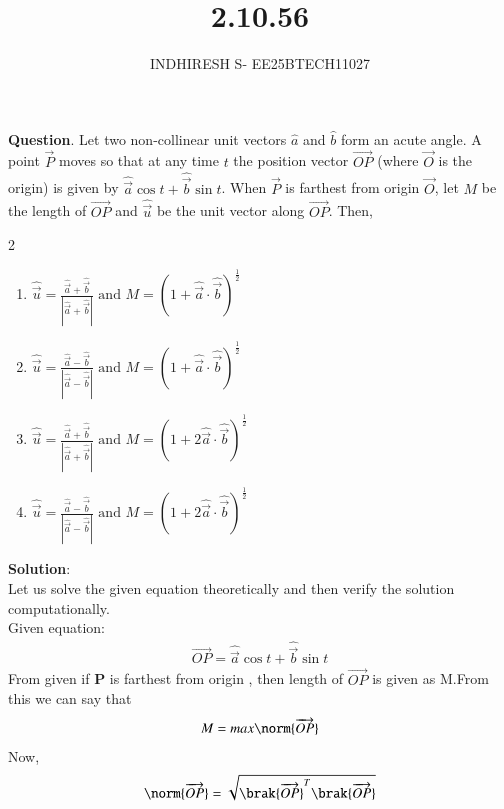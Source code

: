 \documentclass[journal]{IEEEtran}
\theoremstyle{remark}
\begin{document}

\onecolumn

\title{2.10.56}
\author{INDHIRESH S- EE25BTECH11027}
\maketitle


\renewcommand{\thefigure}{\theenumi}
\renewcommand{\thetable}{\theenumi}

\textbf{Question}.  Let two non-collinear unit vectors $\hat{a}$ and $\hat{b}$ form an acute angle. A point $\vec{P}$ moves so that at any time $t$ the position vector $\overrightarrow{OP}$ (where $\vec{O}$ is the origin) is given by $\hat{\vec{a}}\cos{t} + \hat{\vec{b}}\sin{t}$. When $\vec{P}$ is farthest from origin $\vec{O}$, let $M$ be the length of $\overrightarrow{OP}$ and $\hat{\vec{u}}$ be the unit vector along $\overrightarrow{OP}$. Then,
\begin{multicols}{2} 
    \begin{enumerate}
	    \item $\hat{\vec{u}} = \frac{\hat{\vec{a}}+\hat{\vec{b}}}{|\hat{\vec{a}}+\hat{\vec{b}}|} \text{ and } M = (1+\hat{\vec{a}} \cdot \hat{\vec{b}})^{\frac{1}{2}}$
    	\item $\hat{\vec{u}} = \frac{\hat{\vec{a}}-\hat{\vec{b}}}{|\hat{\vec{a}}-\hat{\vec{b}}|} \text{ and } M = (1+\hat{\vec{a}} \cdot \hat{\vec{b}})^{\frac{1}{2}}$
    	\item $\hat{\vec{u}} = \frac{\hat{\vec{a}}+\hat{\vec{b}}}{|\hat{\vec{a}}+\hat{\vec{b}}|} \text{ and } M = (1+2\hat{\vec{a}} \cdot \hat{\vec{b}})^{\frac{1}{2}}$
    	\item $\hat{\vec{u}} = \frac{\hat{\vec{a}}-\hat{\vec{b}}}{|\hat{\vec{a}}-\hat{\vec{b}}|} \text{ and } M = (1+2\hat{\vec{a}} \cdot \hat{\vec{b}})^{\frac{1}{2}}$
    \end{enumerate}
    \end{multicols}
\textbf{Solution}:\\
Let us solve the given equation theoretically and then verify the solution computationally. \\
Given equation:
\begin{align}
     \overrightarrow{OP}=\hat{\vec{a}}\cos{t} + \hat{\vec{b}}\sin{t}
\end{align}
From given if \textbf{P} is farthest from origin , then length of $\overrightarrow{OP}$ is given as M.From this we can say  that
\begin{align}
   M=max\norm{\overrightarrow{OP}}
\end{align}
Now,
\begin{align}
    \norm{\overrightarrow{OP}}=\sqrt{\brak{\overrightarrow{OP}}^T\brak{\overrightarrow{OP}}}
\end{align}
\end{document}
